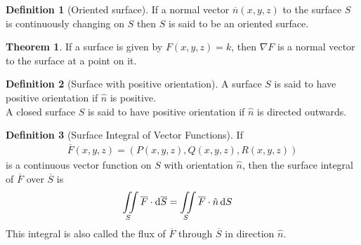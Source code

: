 \documentclass[fleqn, a4paper, 12pt, twoside]{article}
\theoremstyle{definition}
\newtheorem{definition}{Definition}
\theoremstyle{theorem}
\newtheorem{theorem}{Theorem}
\begin{document}
{\begin{definition}[Oriented surface]
	If a normal vector $\overline{n}(x,y,z)$ to the surface $S$ is continuously changing on $S$ then $S$ is said to be an oriented surface.
\end{definition}

\begin{theorem}
	If a surface is given by $F(x,y,z) = k$, then $\nabla F$ is a normal vector to the surface at a point on it.
\end{theorem}

\begin{definition}[Surface with positive orientation]
	A surface $S$ is said to have positive orientation if $\hat{n}$ is positive.\\
	A closed surface $S$ is said to have positive orientation if $\hat{n}$ is directed outwards.
\end{definition}

\begin{definition}[Surface Integral of Vector Functions]
	If 
	\begin{align*}
		\overline{F}(x,y,z) = \left( P(x,y,z) , Q(x,y,z) , R(x,y,z) \right)
	\end{align*}
	is a continuous vector function on $S$ with orientation $\hat{n}$, then the surface integral of $\overline{F}$ over $\overline{S}$ is
	\begin{align*}
		\iint\limits_{S} \overline{F} \cdot \dif \overline{S} & = \iint\limits_{S} \overline{F} \cdot \hat{n} \dif S
	\end{align*}
	This integral is also called the flux of $\overline{F}$ through $\overline{S}$ in direction $\hat{n}$.
\end{definition}

}
\end{document}
